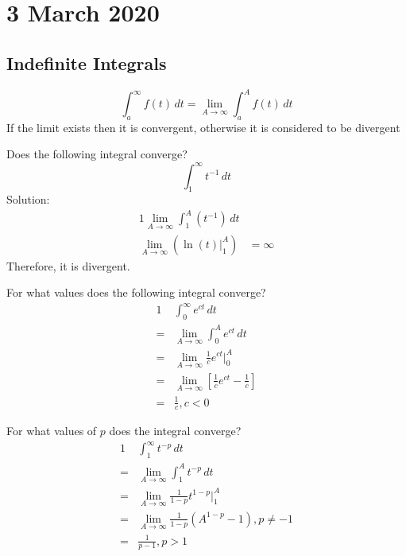 \documentclass[diffeq.tex]{subfiles}
\begin{document}
\chapter{3 March 2020}
    \section{Indefinite Integrals}

    \begin{definition}
        \begin{equation}
            \int_{a}^{\infty}f(t)\,dt = \lim_{A\to\infty}\int_{a}^{A}f(t)\,dt
        \end{equation}
        If the limit exists then it is convergent, otherwise it is considered to be divergent
    \end{definition}
    \np
    \begin{example}
        Does the following integral converge?
        \begin{equation}
            \int_{1}^{\infty} t^{-1}\,dt
        \end{equation}
        Solution:
        \begin{alignat}{1}
            \lim_{A\to\infty}\int_{1}^{A}(t^{-1})\,dt&\\
            \lim_{A\to\infty}\left(\ln(t)|_{1}^{A}\right) &= \infty
        \end{alignat}
        Therefore, it is divergent.
    \end{example}
    \begin{example}
        For what values does the following integral converge?
        \begin{alignat}{1}
            &\int_{0}^{\infty}e^{ct}\,dt\\
            =&\lim_{A\to\infty}\int_{0}^{A}e^{ct}\,dt\\
            =&\lim_{A\to\infty}\frac{1}{c}e^{ct}\bigg|_{0}^{A}\\
            =&\lim_{A\to\infty}\left[\frac{1}{c}e^{ct}-\frac{1}{c}\right]\\
            =& \frac{1}{c}, c < 0
        \end{alignat}
    \end{example}
    \np
    \begin{example}
        For what values of $p$ does the integral converge?
        \begin{alignat}{1}
            &\int_{1}^{\infty}t^{-p}\,dt\\
            =&\lim_{A\to\infty}\int_{1}^{A}t^{-p}\,dt\\
            =&\lim_{A\to\infty}\frac{1}{1-p}t^{1-p}\bigg|_{1}^{A}\\
            =&\lim_{A\to\infty}\frac{1}{1-p}\left(A^{1-p}-1\right), p \neq -1\\
            =& \frac{1}{p - 1}, p > 1
        \end{alignat}
    \end{example}
\end{document}
